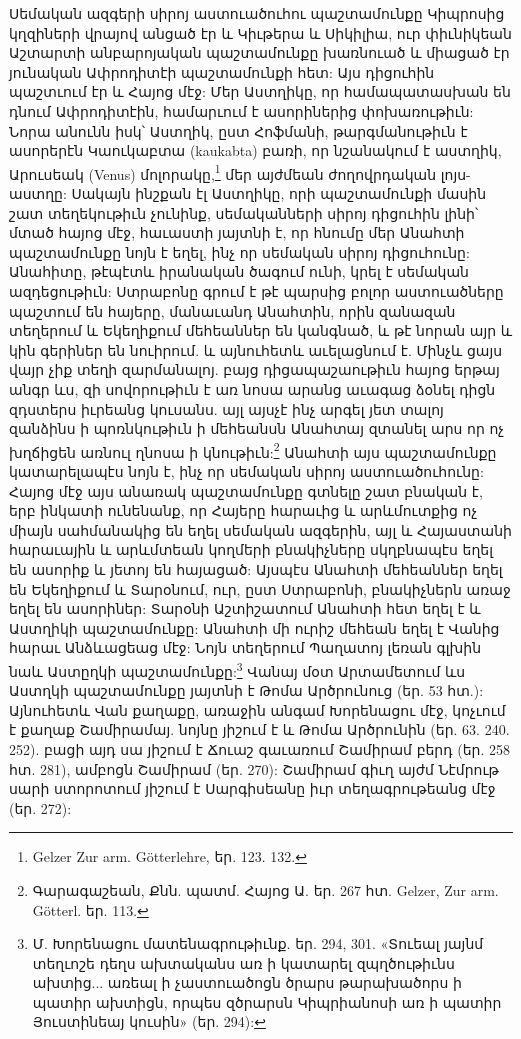 \documentclass{article}
\begin{document}
{Սեմական ազգերի սիրոյ աստուածուհու պաշտամունքը Կիպրոսից կղզիների վրայով անցած էր և Կիւթերա և Սիկիլիա, ուր փիւնիկեան Աշտարտի անբարոյական պաշտամունքը խառնուած և միացած էր յունական Ափրոդիտէի պաշտամունքի հետ: Այս դիցուհին պաշտւում էր և Հայոց մէջ: Մեր Աստղիկը, որ համապատասխան են դնում Ափրոդիտէին, համարւում է ասորիներից փոխառութիւն: Նորա անունն իսկ՝ Աստղիկ, ըստ Հոֆմանի, թարգմանութիւն է ասորերէն Կաուկաբտա (kaukabta) բառի, որ նշանակում է աստղիկ, Արուսեակ (Venus) մոլորակը,\footnote{Gelzer Zur arm. Götterlehre, եր. 123. 132.} մեր այժմեան ժողովրդական լոյս-աստղը: Սակայն ինշքան էլ Աստղիկը, որի պաշտամունքի մասին շատ տեղեկութիւն չունինք, սեմականների սիրոյ դիցուհին լինի՝ մտած հայոց մէջ, հաւաստի յայտնի է, որ հնումը մեր Անահտի պաշտամունքը նոյն է եղել, ինչ որ սեմական սիրոյ դիցուհունը: Անահիտը, թէպէտև իրանական ծագում ունի, կրել է սեմական ազդեցութիւն: Ստրաբոնը գրում է թէ պարսից բոլոր աստուածները պաշտում են հայերը, մանաւանդ Անահտին, որին զանազան տեղերում և Եկեղիքում մեհեաններ են կանգնած, և թէ նորան այր և կին գերիներ են նուիրում. և այնուհետև աւելացնում է. Մինչև ցայս վայր չիք տեղի զարմանալոյ. բայց դիցապաշաութիւն հայոց երթայ անգր ևս, զի սովորութիւն է առ նոսա արանց աւագաց ձօնել դիցն զդստերս իւրեանց կուսանս. այլ այսչէ ինչ արգել յետ տալոյ զանձինս ի պոռնկութիւն ի մեհեանսն Անահտայ զտանել արս որ ոչ խղճիցեն առնուլ ղնոսա ի կնութիւն:\footnote{Գարագաշեան, Քնն. պատմ. Հայոց Ա. եր. 267 հտ. Gelzer, Zur arm. Götterl. եր. 113.} Անահտի այս պաշտամունքը կատարելապէս նոյն է, ինչ որ սեմական սիրոյ աստուածուհունը: Հայոց մէջ այս անառակ պաշտամունքը գտնելը շատ բնական է, երբ ինկատի ունենանք, որ Հայերը հարաւից և արևմուտքից ոչ միայն սահմանակից են եղել սեմական ազգերին, այլ և Հայաստանի հարաւային և արևմտեան կողմերի բնակիչները սկղբնապէս եղել են ասորիք և յետոյ են հայացած: Այսպէս Անահտի մեհեաններ եղել են Եկեղիքում և Տարօնում, ուր, ըստ Ստրաբոնի, բնակիչներն առաջ եղել են ասորիներ: Տարօնի Աշտիշատում Անահտի հետ եղել է և Աստղիկի պաշտամունքը: Անահտի մի ուրիշ մեհեան եղել է Վանից հարաւ Անձևացեաց մէջ: Նոյն տեղերում Պաղատոյ լեռան գլխին նաև Աստըղկի պաշտամունքը:\footnote{Մ. Խորենացու մատենագրութիւնք. եր. 294, 301. «Տուեալ յայնմ տեղւոշե դեղս ախտականս առ ի կատարել զպղծութիւնս ախտից... առեալ ի չաստուածոցն ծրարս թարախածորս ի պատիր ախտիցն, որպես զծրարսն Կիպրիանոսի առ ի պատիր Յուստինեայ կուսին» (եր. 294):} Վանայ մօտ Արտամետում ևս Աստղկի պաշտամունքը յայտնի է Թոմա Արծրունուց (եր. 53 հտ.): Այնուհետև Վան քաղաքը, առաջին անգամ Խորենացու մէջ, կոչւում է քաղաք Շամիրամայ. նոյնը յիշում է և Թոմա Արծրունին (եր. 63. 240. 252). բացի այդ սա յիշում է Ճուաշ գաւառում Շամիրամ բերդ (եր. 258 հտ. 281), ամբոցն Շամիրամ (եր. 270): Շամիրամ գիւղ այժմ Նէմրութ սարի ստորոտում յիշում է Սարգիսեանը իւր տեղագրութեանց մէջ (եր. 272):

}
\end{document}
